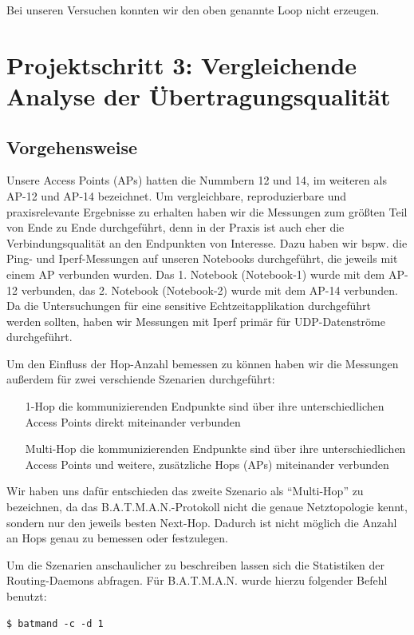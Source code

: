 \documentclass[a4paper,10pt]{article}
\begin{document}
Bei unseren Versuchen konnten wir den oben genannte Loop nicht erzeugen.

\section{Projektschritt 3: Vergleichende Analyse der Übertragungsqualität}

\subsection{Vorgehensweise}

Unsere Access Points (APs) hatten die Nummbern 12 und 14, im weiteren als AP-12 und AP-14 bezeichnet.
Um vergleichbare, reproduzierbare und praxisrelevante Ergebnisse zu erhalten haben wir die Messungen zum größten Teil von Ende zu Ende durchgeführt, denn in der Praxis ist auch eher die Verbindungsqualität an den Endpunkten von Interesse.
Dazu haben wir bspw. die Ping- und Iperf-Messungen auf unseren Notebooks durchgeführt, die jeweils mit einem AP verbunden wurden.
Das 1. Notebook (Notebook-1) wurde mit dem AP-12 verbunden, das 2. Notebook (Notebook-2) wurde mit dem AP-14 verbunden.
Da die Untersuchungen für eine sensitive Echtzeitapplikation durchgeführt werden sollten, haben wir Messungen mit Iperf primär für UDP-Datenströme durchgeführt.

Um den Einfluss der Hop-Anzahl bemessen zu können haben wir die Messungen außerdem für zwei verschiende Szenarien durchgeführt:
\begin{itemize}
  \item[1-Hop] die kommunizierenden Endpunkte sind über ihre unterschiedlichen Access Points direkt miteinander verbunden 
  \item[Multi-Hop] die kommunizierenden Endpunkte sind über ihre unterschiedlichen Access Points und weitere, zusätzliche Hops (APs) miteinander verbunden
\end{itemize}

Wir haben uns dafür entschieden das zweite Szenario als "`Multi-Hop"' zu bezeichnen, da das B.A.T.M.A.N.-Protokoll nicht die genaue Netztopologie kennt, sondern nur den jeweils besten Next-Hop.
Dadurch ist nicht möglich die Anzahl an Hops genau zu bemessen oder festzulegen.

Um die Szenarien anschaulicher zu beschreiben lassen sich die Statistiken der Routing-Daemons abfragen.
Für B.A.T.M.A.N. wurde hierzu folgender Befehl benutzt:

\begin{lstlisting}
$ batmand -c -d 1
\end{lstlisting}
\end{document}

